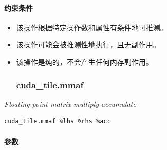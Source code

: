 \documentclass{article}
\begin{document}
\paragraph{约束条件}

\begin{itemize}
\item 该操作根据特定操作数和属性有条件地可推测。
\item 该操作可能会被推测性地执行，且无副作用。
\item 该操作是纯的，不会产生任何内存副作用。


\subsubsection{cuda\_tile.mmaf}

\end{itemize}
\textit{Floating-point matrix-multiply-accumulate}


\begin{lstlisting}
cuda_tile.mmaf %lhs %rhs %acc
\end{lstlisting}

\paragraph{参数}
\end{document}

